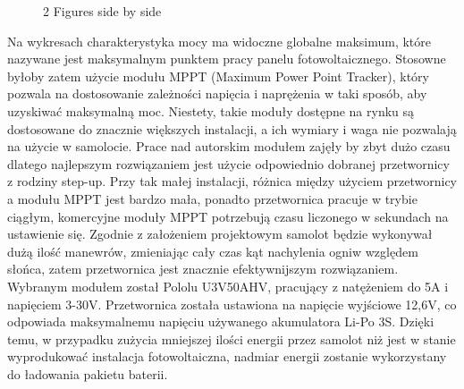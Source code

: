 \documentclass[12pt, a4paper]{article}
\begin{document}
\begin{figure}%
    \centering
    \qquad
    \caption{2 Figures side by side}%
    \label{fig:example}%
\end{figure}

Na wykresach charakterystyka mocy ma widoczne globalne maksimum, które nazywane jest maksymalnym punktem pracy panelu fotowoltaicznego. Stosowne byłoby zatem użycie modułu MPPT (Maximum Power Point Tracker), który pozwala na dostosowanie zależności napięcia i naprężenia w taki sposób, aby uzyskiwać maksymalną moc. Niestety, takie moduły dostępne na rynku są dostosowane do znacznie większych instalacji, a ich wymiary i waga nie pozwalają na użycie w samolocie. Prace nad autorskim modułem zajęły by zbyt dużo czasu dlatego najlepszym rozwiązaniem jest użycie odpowiednio dobranej przetwornicy z rodziny step-up. Przy tak małej instalacji, różnica między użyciem przetwornicy a modułu MPPT jest bardzo mała, ponadto przetwornica pracuje w trybie ciągłym, komercyjne moduły MPPT potrzebują czasu liczonego w sekundach na ustawienie się. Zgodnie z założeniem projektowym samolot będzie wykonywał dużą ilość manewrów, zmieniając cały czas kąt nachylenia ogniw względem słońca, zatem przetwornica jest znacznie efektywnijszym rozwiązaniem. Wybranym modułem został Pololu U3V50AHV, pracujący z natężeniem do 5A i napięciem 3-30V. Przetwornica została ustawiona na napięcie wyjściowe 12,6V, co odpowiada maksymalnemu napięciu używanego akumulatora Li-Po 3S. Dzięki temu, w przypadku zużycia mniejszej ilości energii przez samolot niż jest w stanie wyprodukować instalacja fotowoltaiczna, nadmiar energii zostanie wykorzystany do ładowania pakietu baterii.
\end{document}
